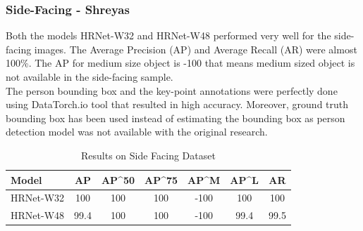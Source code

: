 \documentclass[a4paper,12pt]{article}
\begin{document}
\subsubsection{Side-Facing - Shreyas}
Both the models HRNet-W32 and HRNet-W48 performed very well for the side-facing images. The Average Precision (AP) and Average Recall (AR) were almost 100\%. The AP for medium size object is -100 that means medium sized object is not available in the side-facing sample. \\
The person bounding box and the key-point annotations were perfectly done using DataTorch.io tool that resulted in  high accuracy. Moreover, ground truth bounding box has been used instead of estimating the bounding box as person detection model was not available with the original research.

    \begin{table}[h]
    \begin{center}
    \begin{tabular}{ l | c | c | c | c | c | c}
    Model & AP & AP^{50} & AP^{75} & AP^{M} & AP^{L} & AR \\
    \hline \hline
    HRNet-W32 & 100 & 100 & 100 & -100 & 100 & 100 \\
    HRNet-W48 & 99.4 & 100 & 100 & -100 & 99.4 & 99.5 \\
    \end{tabular}
    \caption{Results on Side Facing Dataset}
    \label{tab:caption}
    \end{center}
    \end{table}
    
\end{document}
